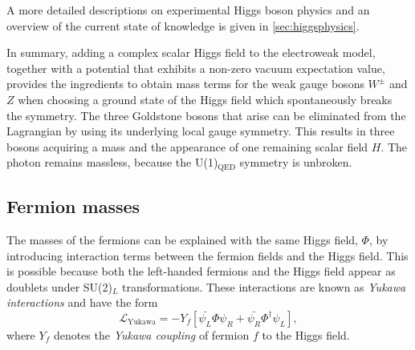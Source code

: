 
A more detailed descriptions on experimental Higgs boson physics and an overview of the current state of knowledge is given in \cref{sec:higgsphysics}.




In summary, adding a complex scalar Higgs field to the electroweak model, together with a potential that exhibits a non-zero vacuum expectation value, provides the ingredients to obtain mass terms for the weak gauge bosons $W^\pm$ and $Z$ when choosing a ground state of the Higgs field which spontaneously breaks the symmetry.
The three Goldstone bosons that arise can be eliminated from the Lagrangian by using its underlying local gauge symmetry. 
This results in three bosons acquiring a mass and the appearance of one remaining scalar field $H$. 
The photon remains massless, because the U(1)$_{\text{QED}}$ symmetry is unbroken. 






\subsection{Fermion masses}
The masses of the fermions can be explained with the same Higgs field, $\Phi$, by introducing interaction terms between the fermion fields and the Higgs field.
This is possible because both the left-handed fermions and the Higgs field appear as doublets under SU(2)$_L$ transformations.
These interactions are known as \emph{Yukawa interactions} and have the form
\begin{equation}
  \mathcal{L}_\text{Yukawa} = - Y_f \left[ \bar{\psi_L} \Phi \psi_R + \bar{\psi_R} \Phi^\dagger \psi_L \right],
  \label{eq:lyukawa}
\end{equation}
where $Y_f$ denotes the \emph{Yukawa coupling} of fermion $f$ to the Higgs field.

